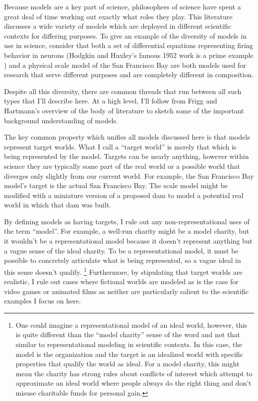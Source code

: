 Because models are a key part of science, philosophers of science have
spent a great deal of time working out exactly what roles they play.
This literature discusses a wide variety of models which are deployed in
different scientific contexts for differing purposes. To give an example
of the diversity of models in use in science, consider that both a set
of differential equations representing firing behavior in neurons
(Hodgkin and Huxley's famous 1952 work is a prime example
\autocite{hodgkinQuantitativeDescriptionMembrane1952}) and a physical
scale model of the San Francisco Bay \autocite{HistoryBayModel} are both
models used for research that serve different purposes and are
completely different in composition.

Despite all this diversity, there are common threads that run between
all such types that I'll describe here. At a high level, I'll follow
from Frigg and Hartmann's \autocite{friggModelsScience2018} overview of
the body of literature to sketch some of the important background
understanding of models.

The key common property which unifies all models discussed here is that
models represent target worlds. What I call a ``target world'' is merely
that which is being represented by the model. Targets can be nearly
anything, however within science they are typically some part of the
real world or a possible world that diverges only slightly from our
current world. For example, the San Francisco Bay model's target is the
actual San Francisco Bay. The scale model might be modified with a
miniature version of a proposed dam to model a potential real world in
which that dam was built.

By defining models as having targets, I rule out any
non-representational uses of the term ``model''. For example, a well-run
charity might be a model charity, but it wouldn't be a representational
model because it doesn't represent anything but a vague sense of the
ideal charity. To be a representational model, it must be possible to
concretely articulate what is being represented, so a vague ideal in
this sense doesn't qualify. \footnote{One could imagine a
  representational model of an ideal world, however, this is quite
  different than the ``model charity'' sense of the word and not that
  similar to representational modeling in scientific contexts. In this
  case, the model is the organization and the target is an idealized
  world with specific properties that qualify the world as ideal. For a
  model charity, this might mean the charity has strong rules about
  conflicts of interest which attempt to approximate an ideal world
  where people always do the right thing and don't misuse charitable
  funds for personal gain.} Furthermore, by stipulating that target
worlds are realistic, I rule out cases where fictional worlds are
modeled as is the case for video games or animated films as neither are
particularly salient to the scientific examples I focus on here.

